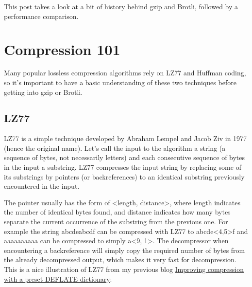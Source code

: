 \documentclass[12pt]{article}
\begin{document}
This post takes a look at a bit of history behind gzip and Brotli,
followed by a performance comparison.

\newpage
\section{Compression 101}

Many popular lossless compression algorithms rely on LZ77 and Huffman
coding, so it’s important to have a basic understanding of these two
techniques before getting into gzip or Brotli.

\subsection{LZ77}

LZ77 is a simple technique developed by Abraham Lempel and Jacob Ziv in
1977 (hence the original name). Let's call the input to the algorithm a
string (a sequence of bytes, not necessarily letters) and each
consecutive sequence of bytes in the input a substring. LZ77 compresses
the input string by replacing some of its substrings by pointers (or
backreferences) to an identical substring previously encountered in the
input.

The pointer usually has the form of <length, distance>, where length
indicates the number of identical bytes found, and distance indicates
how many bytes separate the current occurrence of the substring from the
previous one. For example the string abcdeabcdf can be compressed with
LZ77 to abcde<4,5>f and aaaaaaaaaa can be compressed to simply a<9, 1>.
The decompressor when encountering a backreference will simply copy the
required number of bytes from the already decompressed output, which
makes it very fast for decompression. This is a nice illustration of
LZ77 from my previous blog
\href{https://blog.cloudflare.com/improving-compression-with-preset-deflate-dictionary/}{Improving
compression with a preset DEFLATE dictionary}:
\\\\
\end{document}
